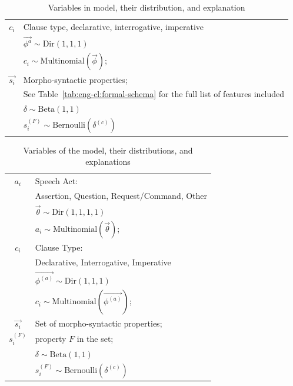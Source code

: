 \begin{table}[H]
    \centering
    \begin{tabular}{cl}
    \hline
    \hline
        $c_{i}$ &  Clause type, declarative, interrogative, imperative\\
        &$\vec{\phi^{a}} \sim \mbox{Dir}(1,1,1)$\\        
        & $ c_{i} \sim  \mbox{Multinomial}(\vec{\phi})$;\\
\hline
        $\vec{s_{i}}$ &  Morpho-syntactic properties; \\
        & See Table~\ref{tab:eng-cl:formal-schema} for the full list of features included \\
        &$\delta\sim \mbox{Beta}(1,1)$\\        
        & $s_{i}^{(F)} \sim \mbox{Bernoulli}(\delta^{(c)})$ \\
    \hline
    \hline
    \end{tabular}
    \caption{Variables in \distlearner{} model, their distribution, and explanation}
    \label{tab:engcl:baseline-variables}
\end{table}


\begin{table}[H]
    \centering
    \begin{tabular}{c|l}
    \hline
    \hline
        $a_{i}$ & Speech Act: \\
        	  &Assertion, Question, Request/Command, Other\\
          & $\vec{\theta} \sim \mbox{Dir}(1,1,1,1)$\\
          & $ a_{i} \sim \mbox{Multinomial}(\vec{\theta})$;\\

\hline
         $c_{i}$ &  Clause Type:\\
        & Declarative, Interrogative, Imperative\\
        &$\vec{\phi^{(a)}} \sim \mbox{Dir}(1,1,1)$\\
        &  $c_{i} \sim  \mbox{Multinomial}(\vec{\phi^{(a)}})$;\\
\hline
        $\vec{s_{i}}$ &  Set of morpho-syntactic properties; \\
        $s_{i}^{(F)}$ &  property $F$ in the set;  \\
        &$\delta\sim \mbox{Beta}(1,1)$\\        
        & $s_{i}^{(F)} \sim \mbox{Bernoulli}(\delta^{(c)})$ \\
    \hline
    \hline
    \end{tabular}
    \caption{Variables of the \plearnerabbr{} model, their distributions, and explanations}
    \label{tab:engcl:target-variables}
\end{table}


